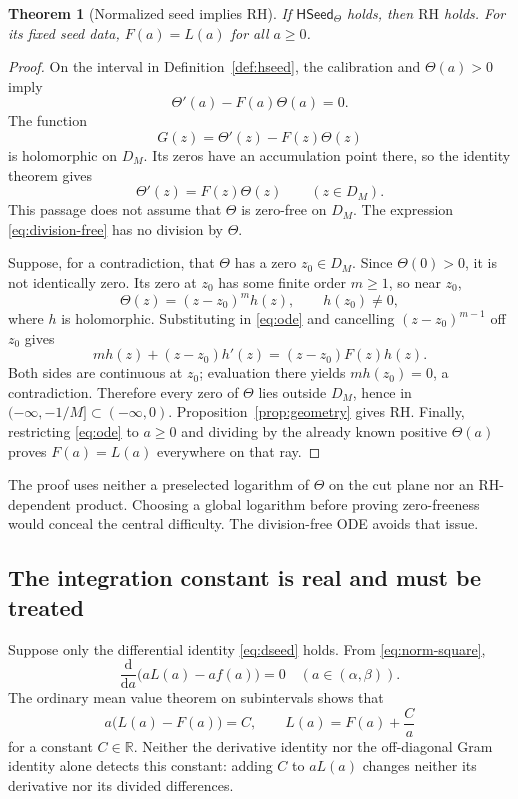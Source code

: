 \documentclass[11pt,a4paper]{article}
\numberwithin{equation}{section}
\newtheorem{theorem}{Theorem}[section]
\theoremstyle{definition}
\theoremstyle{remark}
\newcommand{\R}{\mathbb R}
\newcommand{\RH}{\mathrm{RH}}
\newcommand{\HSeed}{\mathsf{HSeed}_{\Theta}}
\begin{document}
\begin{theorem}[Normalized seed implies RH]\label{thm:forward}
If $\HSeed$ holds, then $\RH$ holds. For its fixed seed data,
$F(a)=L(a)$ for all $a\geq0$.
\end{theorem}
\begin{proof}
On the interval in Definition~\ref{def:hseed}, the calibration and
$\Theta(a)>0$ imply
\[
\Theta'(a)-F(a)\Theta(a)=0.
\]
The function
\begin{equation}\label{eq:division-free}
G(z)=\Theta'(z)-F(z)\Theta(z)
\end{equation}
is holomorphic on $D_M$. Its zeros have an accumulation point there,
so the identity theorem gives
\begin{equation}\label{eq:ode}
\Theta'(z)=F(z)\Theta(z)\qquad(z\in D_M).
\end{equation}
This passage does not assume that $\Theta$ is zero-free on $D_M$.
The expression \eqref{eq:division-free} has no division by $\Theta$.

Suppose, for a contradiction, that $\Theta$ has a zero $z_0\in D_M$.
Since $\Theta(0)>0$, it is not identically zero. Its zero at $z_0$ has
some finite order $m\geq1$, so near $z_0$,
\[
\Theta(z)=(z-z_0)^m h(z),\qquad h(z_0)\ne0,
\]
where $h$ is holomorphic. Substituting in \eqref{eq:ode} and cancelling
$(z-z_0)^{m-1}$ off $z_0$ gives
\[
mh(z)+(z-z_0)h'(z)=(z-z_0)F(z)h(z).
\]
Both sides are continuous at $z_0$; evaluation there yields
$mh(z_0)=0$, a contradiction.
Therefore every zero of $\Theta$ lies outside $D_M$, hence in
$(-\infty,-1/M]\subset(-\infty,0)$.
Proposition~\ref{prop:geometry} gives RH. Finally, restricting
\eqref{eq:ode} to $a\geq0$ and dividing by the already known positive
$\Theta(a)$ proves $F(a)=L(a)$ everywhere on that ray.
\end{proof}

The proof uses neither a preselected logarithm of $\Theta$ on the cut
plane nor an RH-dependent product. Choosing a global logarithm before
proving zero-freeness would conceal the central difficulty. The
division-free ODE avoids that issue.

\subsection{The integration constant is real and must be treated}

Suppose only the differential identity \eqref{eq:dseed} holds. From
\eqref{eq:norm-square},
\[
\frac{\mathrm d}{\mathrm da}\bigl(aL(a)-af(a)\bigr)=0
\quad(a\in(\alpha,\beta)).
\]
The ordinary mean value theorem on subintervals shows that
\begin{equation}\label{eq:gauge}
a\bigl(L(a)-F(a)\bigr)=C,
\qquad L(a)=F(a)+\frac Ca
\end{equation}
for a constant $C\in\R$. Neither the derivative identity nor the
off-diagonal Gram identity alone detects this constant: adding $C$ to
$aL(a)$ changes neither its derivative nor its divided differences.
\end{document}
